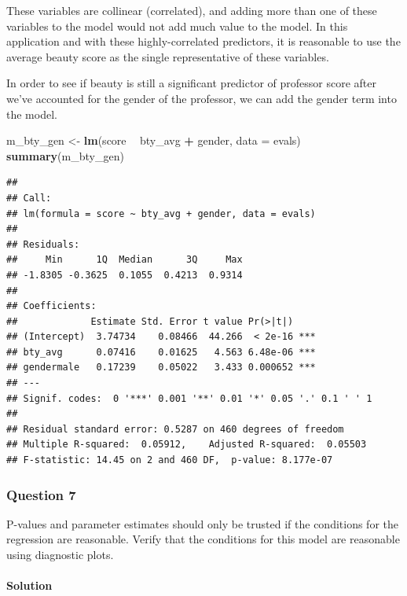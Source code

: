 \documentclass[]{article}
\newenvironment{Shaded}{\begin{snugshade}}{\end{snugshade}}
\newcommand{\KeywordTok}[1]{\textcolor[rgb]{0.13,0.29,0.53}{\textbf{#1}}}
\newcommand{\DataTypeTok}[1]{\textcolor[rgb]{0.13,0.29,0.53}{#1}}
\newcommand{\StringTok}[1]{\textcolor[rgb]{0.31,0.60,0.02}{#1}}
\newcommand{\OperatorTok}[1]{\textcolor[rgb]{0.81,0.36,0.00}{\textbf{#1}}}
\newcommand{\NormalTok}[1]{#1}
\let\oldparagraph\paragraph
\renewcommand{\paragraph}[1]{\oldparagraph{#1}\mbox{}}
\begin{document}
These variables are collinear (correlated), and adding more than one of
these variables to the model would not add much value to the model. In
this application and with these highly-correlated predictors, it is
reasonable to use the average beauty score as the single representative
of these variables.

In order to see if beauty is still a significant predictor of professor
score after we've accounted for the gender of the professor, we can add
the gender term into the model.

\begin{Shaded}
\begin{Highlighting}[]
\NormalTok{m_bty_gen <-}\StringTok{ }\KeywordTok{lm}\NormalTok{(score }\OperatorTok{~}\StringTok{ }\NormalTok{bty_avg }\OperatorTok{+}\StringTok{ }\NormalTok{gender, }\DataTypeTok{data =}\NormalTok{ evals)}
\KeywordTok{summary}\NormalTok{(m_bty_gen)}
\end{Highlighting}
\end{Shaded}

\begin{verbatim}
## 
## Call:
## lm(formula = score ~ bty_avg + gender, data = evals)
## 
## Residuals:
##     Min      1Q  Median      3Q     Max 
## -1.8305 -0.3625  0.1055  0.4213  0.9314 
## 
## Coefficients:
##             Estimate Std. Error t value Pr(>|t|)    
## (Intercept)  3.74734    0.08466  44.266  < 2e-16 ***
## bty_avg      0.07416    0.01625   4.563 6.48e-06 ***
## gendermale   0.17239    0.05022   3.433 0.000652 ***
## ---
## Signif. codes:  0 '***' 0.001 '**' 0.01 '*' 0.05 '.' 0.1 ' ' 1
## 
## Residual standard error: 0.5287 on 460 degrees of freedom
## Multiple R-squared:  0.05912,    Adjusted R-squared:  0.05503 
## F-statistic: 14.45 on 2 and 460 DF,  p-value: 8.177e-07
\end{verbatim}

\subsubsection{Question 7}\label{question-7}

P-values and parameter estimates should only be trusted if the
conditions for the regression are reasonable. Verify that the conditions
for this model are reasonable using diagnostic plots.

\paragraph{Solution}\label{solution-6}
\end{document}
